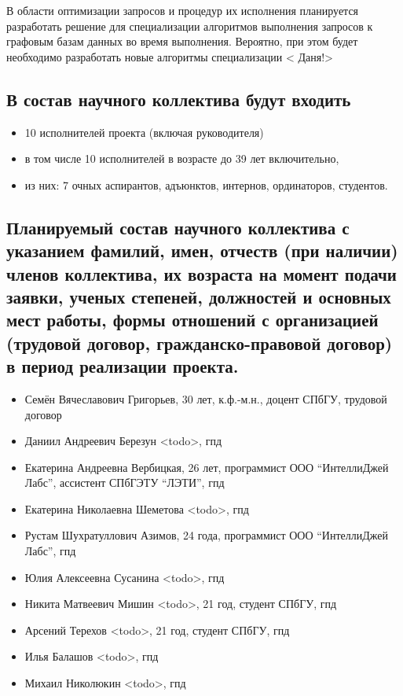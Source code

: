 \documentclass[12pt]{article}  %
\theoremstyle{remark}
\begin{document}
В области оптимизации запросов и процедур их исполнения планируется разработать решение для специализации алгоритмов выполнения запросов к графовым базам данных во время выполнения. Вероятно, при этом будет необходимо разработать новые алгоритмы специализации
{\huge< Даня!>}

\subsection{В состав научного коллектива будут входить}
%
\begin{itemize}
\item 10 исполнителей проекта (включая руководителя)
\item в том числе 10  исполнителей в возрасте до 39 лет включительно,
\item из них: 7 очных аспирантов, адъюнктов, интернов, ординаторов, студентов.
\end{itemize}

\subsection{Планируемый состав научного коллектива с указанием фамилий, имен, отчеств (при наличии) членов коллектива, их возраста на момент подачи заявки, ученых степеней, должностей и основных мест работы, формы отношений с организацией (трудовой договор, гражданско-правовой договор) в период реализации проекта.}

\begin{itemize}
  \item Семён Вячеславович Григорьев, 30 лет, к.ф.-м.н., доцент СПбГУ, трудовой договор
  \item Даниил Андреевич Березун {\huge<todo>}, гпд
  \item Екатерина Андреевна Вербицкая, 26 лет, программист ООО ``ИнтеллиДжей Лабс'', ассистент СПбГЭТУ ``ЛЭТИ'', гпд
  \item Екатерина Николаевна Шеметова {\huge<todo>}, гпд
  \item Рустам Шухратуллович Азимов, 24 года, программист ООО ``ИнтеллиДжей Лабс'', гпд
  \item Юлия Алексеевна Сусанина {\huge<todo>}, гпд
  \item Никита Матвеевич Мишин {\huge<todo>}, 21 год, студент СПбГУ, гпд
  \item Арсений Терехов {\huge<todo>}, 21 год, студент СПбГУ, гпд
  \item Илья Балашов {\huge<todo>}, гпд
  \item Михаил Николюкин {\huge<todo>}, гпд
\end{itemize}
\end{document}
